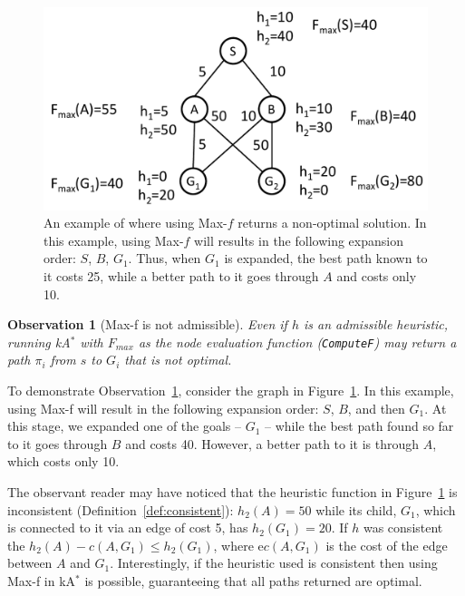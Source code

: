 \documentclass{aicom2e}
\newtheorem{observation}{Observation}
\newcommand{\kastar}{kA$^*$}
\newcommand{\maxf}{Max-f}
\begin{document}
 
 \begin{figure}
 \includegraphics[width=\columnwidth]{max-bad_cropped.pdf}      
 \caption{An example of where using Max-$f$ returns a non-optimal solution. In this example, 
 using Max-$f$ will results in the following expansion order: $S$, $B$, $G_1$. 
 Thus, when $G_1$ is expanded, the best path known to it costs 25, while a 
 better path to it goes through $A$ and costs only 10.}
 \label{fig:max-bad}
 \end{figure}
 
 \begin{observation}[\maxf{} is not admissible]
 	Even if $h$ is an admissible heuristic, 
 	running \kastar{} with $F_{max}$ 
 	as the node evaluation function ({\tt ComputeF}) may return a path $\pi_i$ from $s$ to $G_i$ that is not optimal. 
 	\label{obs:max-f-inadmissible}
 \end{observation}
To demonstrate Observation~\ref{obs:max-f-inadmissible}, consider the graph in Figure~\ref{fig:max-bad}.
 In this example, using \maxf{} will result in the following expansion order: $S$, $B$, and then $G_1$. At this stage, we expanded one of the goals -- $G_1$ -- while the best path found so far to it goes through $B$ and costs 40. However, a better path to it is through $A$, which costs only 10.
 
 
  The observant reader may have noticed that the heuristic function in Figure~\ref{fig:max-bad} is inconsistent (Definition~\ref{def:consistent}): $h_2(A)=50$ while its child, $G_1$, which is connected to it via an edge of cost 5, has $h_2(G_1)=20$. If $h$ was consistent the $h_2(A)-c(A,G_1)\leq h_2(G_1)$, where e$c(A,G_1)$ is the cost of the edge between $A$ and $G_1$. 
  Interestingly, if the heuristic used is consistent then using \maxf{} in \kastar{} is possible, guaranteeing that all paths returned are optimal. %
 
\end{document}
